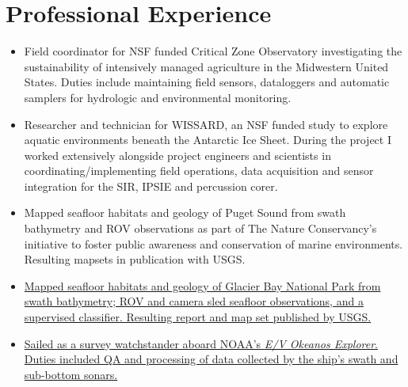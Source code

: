 \section{Professional Experience}

\begin{itemize}
\item Field coordinator for NSF funded Critical Zone Observatory investigating the sustainability of intensively managed agriculture in the Midwestern United States. 
  Duties include maintaining field sensors, dataloggers and automatic samplers for hydrologic and environmental monitoring.
\end{itemize}

\begin{itemize}
\item Researcher and technician for WISSARD, an NSF funded study to explore aquatic environments beneath the Antarctic Ice
  Sheet. During the project I worked extensively alongside project engineers and scientists in coordinating/implementing field operations, data acquisition and sensor integration for the SIR, IPSIE and percussion corer. 
\item Mapped seafloor habitats and geology of Puget Sound from swath bathymetry and ROV observations as part of The Nature
  Conservancy's initiative to foster public awareness and conservation of marine
  environments. Resulting mapsets in publication with USGS.

\item \href{http://pubs.usgs.gov/sim/3253/}{Mapped seafloor habitats and geology
  of Glacier Bay National Park from swath bathymetry; ROV and camera sled seafloor observations, and a supervised classifier. Resulting report and map set published by USGS.}
  
\end{itemize}

\begin{itemize}
\item \href{http://www.niutoday.info/2014/04/17/niu-student-lands-coveted-internship-aboard-exploration-ship/}
  {Sailed as a survey watchstander aboard NOAA's \textit{E/V Okeanos Explorer}.
  Duties included QA and processing of data collected by the ship's swath and sub-bottom sonars.}
\end{itemize}

